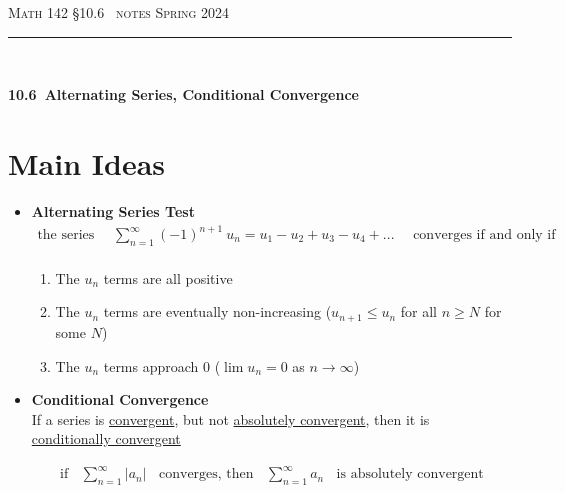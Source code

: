 \documentclass{article}
\def\chapt{10.6}
\begin{document}
\noindent
{\scshape Math 142} \hfill {\scshape \S\chapt~ notes} \hfill {\scshape Spring 2024}

\smallskip

\hrule

\bigskip

\hfill
\\

\thispagestyle{empty}

{
\huge
\noindent
\textbf{\chapt~Alternating Series, Conditional Convergence}
}

\section*{Main Ideas}

\begin{itemize}

\item
\textbf{Alternating Series Test}
\begin{gather*}
\text{the series}~~~~~~
\sum_{n=1}^{\infty} (-1)^{n+1} ~u_n = u_1 - u_2 + u_3 - u_4 + ...
~~~~~~\text{converges if and only if}
\\
\end{gather*}

\begin{enumerate}
\item
The $u_n$ terms are all positive

\item
The $u_n$ terms are eventually non-increasing ($u_{n+1} \leq u_n$ for all $n \geq N$ for some $N$)

\item
The $u_n$ terms approach 0 ($\lim u_n=0$ as $n\to \infty$)
\end{enumerate}

\item
\textbf{Conditional Convergence}
\\

If a series is \underline{convergent}, but not \underline{absolutely convergent},
then it is \underline{conditionally convergent}

\begin{gather*}
\text{if}~~~~
\sum_{n=1}^{\infty} |a_n|
~~~~\text{converges, then}~~~~
\sum_{n=1}^{\infty} a_n
~~~~\text{is absolutely convergent}
\end{gather*}

\end{itemize}
\hfill
\\
\end{document}
